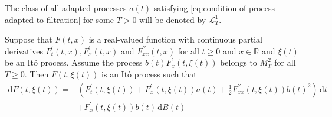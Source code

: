 \begin{remark}
    The class of all adapted processes $a(t)$ satisfying \ref{eq:condition-of-process-adapted-to-filtration} for some $T>0$ will be denoted by $\mathcal{L}_{T}^{1}$.
\end{remark}

\begin{theorem}[It\^o Formula]
    Suppose that $F(t,x)$ is a real-valued function with continuous partial derivatives $F_{t}^{\prime}(t,x),F_{x}^{\prime}(t,x)$ and $F_{xx}^{\prime\prime}(t,x)$ for all $t\geq 0$ and $x\in\mathbb{R}$ and $\xi(t)$ be an It\^o process. Assume the process $b(t)F_{x}^{\prime}(t,\xi(t))$ belongs to $M_{T}^{2}$ for all $T\geq 0$. Then $F(t,\xi(t))$ is an It\^o process such that
    \begin{equation}
        \begin{aligned}
            \mathrm{d}F(t,\xi(t))= & \left(F_{t}^{\prime}(t,\xi(t))+F_{x}^{\prime}(t,\xi(t))a(t)+\frac{1}{2}F_{xx}^{\prime\prime}(t,\xi(t))b(t)^{2}\right)\,\mathrm{d}t \\
                                   & +F_{x}^{\prime}(t,\xi(t))b(t)\,\mathrm{d}B(t)
        \end{aligned}
    \end{equation}
\end{theorem}

\begin{example}

\end{example}

\begin{example}

\end{example}

\begin{example}

\end{example}